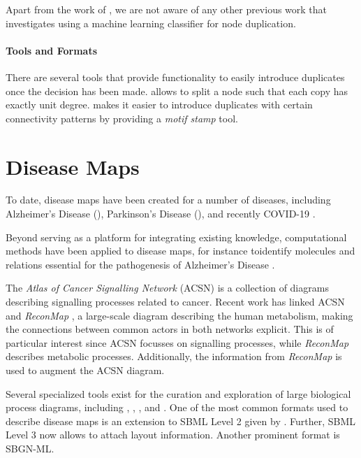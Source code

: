\documentclass[
	fontsize=10pt, %
	twoside=false, %
	secnumdepth=1, %
  toc=indentunnumbered %
]{kaobook}
\begin{document}
Apart from the work of \citeauthor{nielsen_MachineLearningSupport_2019}, we are
not aware of any other previous work that investigates using a machine learning
classifier for node duplication.


\paragraph{Tools and Formats}
There are several tools that provide functionality to easily introduce
duplicates once the decision has been made. 
\cite{villeger_ArcadiaVisualizationTool_2010} allows to split a node such that
each copy has exactly unit degree. 
\cite{droste_OmixVisualizationTool_2013} makes it easier to introduce duplicates
with certain connectivity patterns by providing a \textit{motif stamp} tool.
%


\section{Disease Maps}
To date, disease maps have been created for a number of diseases, including
Alzheimer's Disease (\alzpathway \cite{ogishima_AlzPathwayUpdatedMap_2016}),
Parkinson's Disease (\pdmap \cite{fujita_IntegratingPathwaysParkinson_2014}),
and recently \textsc{COVID-19}
\cite{ostaszewski_COVID19DiseaseMap_2020}.

Beyond serving as a platform for integrating existing knowledge, computational
methods have been applied to disease maps, for instance toidentify molecules and
relations essential for the pathogenesis of Alzheimer's Disease
\cite{mizuno_NetworkAnalysisComprehensive_2016}.

The \textit{Atlas of Cancer Signalling Network} (ACSN)
\cite{kuperstein_AtlasCancerSignalling_2015} is a collection of diagrams
describing signalling processes related to cancer. Recent work
\cite{sompairac_metabolic_2019} has linked ACSN and \textit{ReconMap}
\cite{noronha_ReconMapInteractiveVisualization_2017}, a
large-scale diagram describing the human metabolism, making
the connections between common actors in both networks explicit. This is of
particular interest since ACSN focusses on signalling processes, while
\textit{ReconMap} describes metabolic processes.
Additionally, the information from \textit{ReconMap} is used to augment the ACSN diagram.


Several specialized tools exist for the curation and exploration of large
biological process diagrams, including 
\cite{funahashi_CellDesignerVersatileModeling_2008}, 
\cite{gawron_MINERVAPlatformVisualization_2016}, 
\cite{kuperstein_NaviCellWebbasedEnvironment_2013}, 
\cite{shannon_cytoscape_2003} and 
\cite{rohn_VANTEDV2Framework_2012}.
%
One of the most common formats used to describe disease maps is an extension to SBML
Level 2 given by . Further, SBML Level 3 now allows to attach
layout information. Another prominent format is SBGN-ML.
\end{document}
